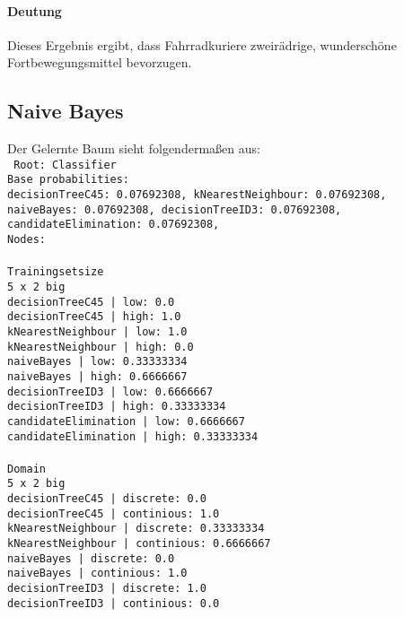 \documentclass[a4paper]{article}
\begin{document}
\paragraph{Deutung}
Dieses Ergebnis ergibt, dass Fahrradkuriere zweirädrige, wunderschöne Fortbewegungsmittel bevorzugen.

\subsection{Naive Bayes}
Der Gelernte Baum sieht folgendermaßen aus:\\
\texttt{
Root: Classifier \\
Base probabilities: \\
decisionTreeC45: 0.07692308, kNearestNeighbour: 0.07692308, naiveBayes: 0.07692308, decisionTreeID3: 0.07692308, candidateElimination: 0.07692308, \\
Nodes: \\
\\
Trainingsetsize \\
5 x 2 big \\
decisionTreeC45 | low: 0.0 \\
decisionTreeC45 | high: 1.0 \\
kNearestNeighbour | low: 1.0 \\
kNearestNeighbour | high: 0.0 \\
naiveBayes | low: 0.33333334 \\
naiveBayes | high: 0.6666667 \\
decisionTreeID3 | low: 0.6666667 \\
decisionTreeID3 | high: 0.33333334 \\
candidateElimination | low: 0.6666667 \\
candidateElimination | high: 0.33333334 \\
\\
Domain \\
5 x 2 big \\
decisionTreeC45 | discrete: 0.0 \\
decisionTreeC45 | continious: 1.0 \\
kNearestNeighbour | discrete: 0.33333334 \\
kNearestNeighbour | continious: 0.6666667\\
naiveBayes | discrete: 0.0 \\
naiveBayes | continious: 1.0 \\
decisionTreeID3 | discrete: 1.0 \\
decisionTreeID3 | continious: 0.0 \\
}
\end{document}
